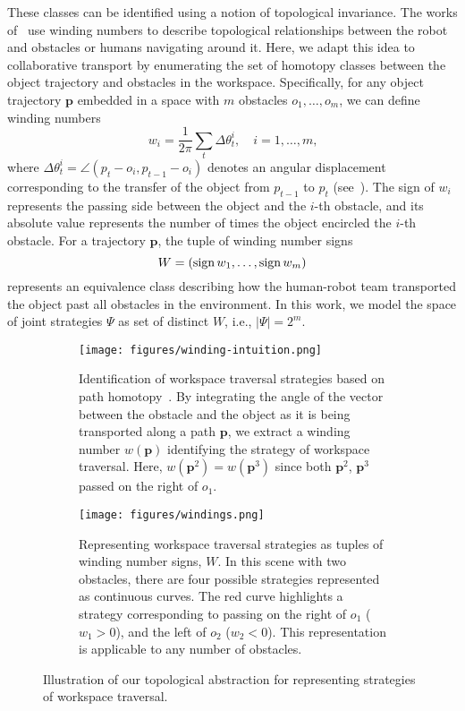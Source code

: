 These classes can be identified using a notion of topological invariance. The works of~\citet{vernaza2013winding,kretzschmar2016irl,mavrogiannis2023winding} use winding numbers to describe topological relationships between the robot and obstacles or humans navigating around it. Here, we adapt this idea to collaborative transport by enumerating the set of homotopy classes between the object trajectory and obstacles in the workspace. Specifically, for any object trajectory $\boldsymbol{p}$ embedded in a space with $m$ obstacles $o_1,\dots, o_m$, we can define winding numbers
\begin{equation}
    w_i = \frac{1}{2\pi}\sum_{t} \Delta\theta_t^i, \quad i=1,\dots, m\mbox{,}
\end{equation}
where $\Delta\theta^i_t = \angle \left(p_t - o_i, p_{t-1}-o_i\right)$ denotes an angular displacement corresponding to the transfer of the object from $p_{t-1}$ to $p_t$ (see~). The sign of $w_i$ represents the passing side between the object and the $i$-th obstacle, and its absolute value represents the number of times the object encircled the $i$-th obstacle.
For a trajectory $\boldsymbol{p}$, the tuple of winding number signs
\begin{equation}
    W=(\operatorname{sign}{w_1},\dots, \operatorname{sign}{w_m})
\end{equation}
represents an equivalence class describing how the human-robot team transported the object past all obstacles in the environment. In this work, we model the space of joint strategies $\Psi$ as set of distinct $W$, i.e., $|\Psi|=2^m$.


\begin{figure}[t]
\begin{subfigure}{\linewidth}
    \centering
    \texttt{[image: figures/winding-intuition.png]}
    \caption{
    Identification of workspace traversal strategies based on path homotopy~\citep{kretzschmar2016irl}. By integrating the angle of the vector between the obstacle and the object as it is being transported along a path $\boldsymbol{p}$, we extract a winding number $w(\boldsymbol{p})$ identifying the strategy of workspace traversal. Here, $w(\boldsymbol{p}^2)=w(\boldsymbol{p}^3)$ since both $\boldsymbol{p}^2$, $\boldsymbol{p}^3$ passed on the right of $o_1$.}
    \label{fig:winding}
\end{subfigure}
\begin{subfigure}{\linewidth}
    \texttt{[image: figures/windings.png]}
    \caption{Representing workspace traversal strategies as tuples of winding number signs, $W$. In this scene with two obstacles, there are four possible strategies represented as continuous curves. The red curve highlights a strategy corresponding to passing on the right of $o_1$ ($w_1>0$), and the left of $o_2$ ($w_2<0$). This representation is applicable to any number of obstacles.}
    \label{fig:passing-strategy}
\end{subfigure}
\caption{Illustration of our topological abstraction for representing strategies of workspace traversal.\label{fig:workspace-traversal}}
\end{figure}


